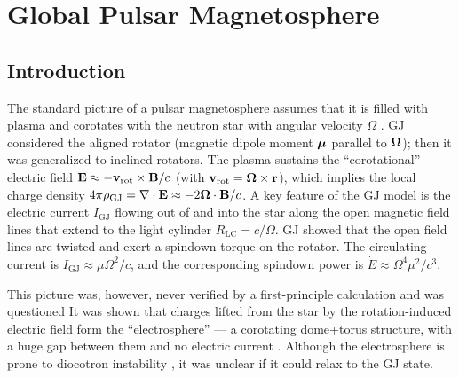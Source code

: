 
\def\bB{{\,\mathbf B}}
\def\bE{{\,\mathbf E}}
\def\bS{{\,\mathbf S}}
\def\bJ{{\,\mathbf J}}
\def\bv{{\,\mathbf v}}
\def\Rmax{R_{\rm max}}

\def\rhoGJ{\rho_{\rm GJ}}
\def\IGJ{I_{\rm GJ}}
\def\gthr{\gamma_{\rm thr}}
\def\RLC{R_{\rm LC}}
\def\Rout{R_{\rm out}}
\def\gmax{\gamma_{\max}}
\def\br{{\mathbf r}}
\def\Phipc{\Phi_0}
\def\Phithr{\Phi_\pm}
\def\Phimax{\Phi_\star}
\def\gamLC{\gamma_0}
\def\fLC{f_{\rm LC}}
\def\gdrag{\gamma_{\rm drag}}
\def\bvrot{\bv_{\rm rot}}
\def\Lsd{L_{\rm sd}}
\def\lav{\bar{l}}
\def\ldisp{\Delta l}
\def\Lin{L_{\rm in}}
\def\Rs{R_{\star}}
\def\rL{r_{\rm L}}
\def\dNi{\dot{N}_i}

\chapter{Global Pulsar Magnetosphere}
\label{chap:pulsar}

\section{Introduction}

The standard picture of a pulsar magnetosphere assumes that it is
filled with plasma and  corotates with the neutron star with angular velocity $\Omega$
\citep[hereafter GJ]{goldreich_pulsar_1969}.  GJ considered the
aligned rotator (magnetic dipole moment $\bm{\mu}$ parallel to $\bm{\Omega}$);
then it was generalized to inclined rotators.  The
plasma sustains the ``corotational'' electric field $\mathbf{E}\approx
-\mathbf{v}_{\rm rot}\times \mathbf{B}/c$
(with $\mathbf{v}_\mathrm{rot}=\bOm\times\br$), which implies the local charge density
$4\pi\rho_\mathrm{GJ}=\nabla\cdot \mathbf{E} \approx -2\bm{\Omega}\cdot\mathbf{B}/c$.
A key feature of the GJ model is the electric current $I_\mathrm{GJ}$ flowing out of
and into the star along the open magnetic field lines that extend to
the light cylinder $R_\mathrm{LC}=c/\Omega$. GJ showed that the open field
lines are twisted and exert a spindown torque on the rotator.  The
circulating current is $I_\mathrm{GJ}\approx \mu \Omega^2/c$, and the
corresponding spindown power is $\dot{E}\approx \Omega^4\mu^2/c^3$.

This picture was, however, never verified by a first-principle calculation and
was questioned
\citep{michel_state_2004, gruzinov_aristotelian_2013}
It was shown that charges lifted from the star by the rotation-induced
electric field form the ``electrosphere''
--- a corotating dome+torus structure,
with a huge gap between them and no electric current
\citep{jackson_new_1976, krause-polstorff_electrosphere_1985}.
Although the electrosphere
is prone to diocotron instability
\citep{petri_diocotron_2002,spitkovsky_simulations_2002},
it was unclear if it could relax to the GJ state.

